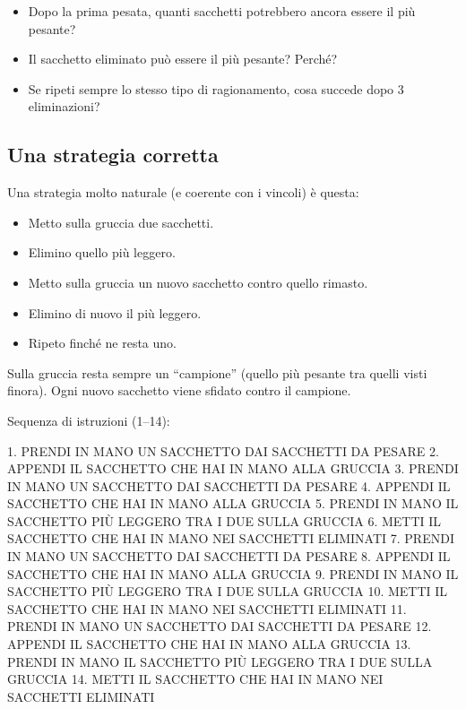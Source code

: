 \begin{domandestimolo}\label{domande-stimolo-10}

\begin{itemize}
\item
  Dopo la prima pesata, quanti sacchetti potrebbero ancora essere il più pesante?
\item
  Il sacchetto eliminato può essere il più pesante? Perché?
\item
  Se ripeti sempre lo stesso tipo di ragionamento, cosa succede dopo 3 eliminazioni?
\end{itemize}
\end{domandestimolo}

\subsection{Una strategia corretta }\label{una-strategia-corretta}

Una strategia molto naturale (e coerente con i vincoli) è questa:

\begin{itemize}
\item
  Metto sulla gruccia due sacchetti.
\item
  Elimino quello più leggero.
\item
  Metto sulla gruccia un nuovo sacchetto contro quello rimasto.
\item
  Elimino di nuovo il più leggero.
\item
  Ripeto finché ne resta uno.
\end{itemize}

\begin{spiegazione}\label{idea-di-spiegazione}
Sulla gruccia resta sempre un ``campione'' (quello più pesante tra quelli visti finora). Ogni nuovo sacchetto viene sfidato contro il campione.
\end{spiegazione}


Sequenza di istruzioni (1--14):

{\small
\begin{pseudocodice}
 1. PRENDI IN MANO UN SACCHETTO DAI SACCHETTI DA PESARE
 2. APPENDI IL SACCHETTO CHE HAI IN MANO ALLA GRUCCIA
 3. PRENDI IN MANO UN SACCHETTO DAI SACCHETTI DA PESARE
 4. APPENDI IL SACCHETTO CHE HAI IN MANO ALLA GRUCCIA
 5. PRENDI IN MANO IL SACCHETTO PIÙ LEGGERO TRA I DUE SULLA GRUCCIA
 6. METTI IL SACCHETTO CHE HAI IN MANO NEI SACCHETTI ELIMINATI
 7. PRENDI IN MANO UN SACCHETTO DAI SACCHETTI DA PESARE
 8. APPENDI IL SACCHETTO CHE HAI IN MANO ALLA GRUCCIA
 9. PRENDI IN MANO IL SACCHETTO PIÙ LEGGERO TRA I DUE SULLA GRUCCIA
10. METTI IL SACCHETTO CHE HAI IN MANO NEI SACCHETTI ELIMINATI
11. PRENDI IN MANO UN SACCHETTO DAI SACCHETTI DA PESARE
12. APPENDI IL SACCHETTO CHE HAI IN MANO ALLA GRUCCIA
13. PRENDI IN MANO IL SACCHETTO PIÙ LEGGERO TRA I DUE SULLA GRUCCIA
14. METTI IL SACCHETTO CHE HAI IN MANO NEI SACCHETTI ELIMINATI
\end{pseudocodice}
}


